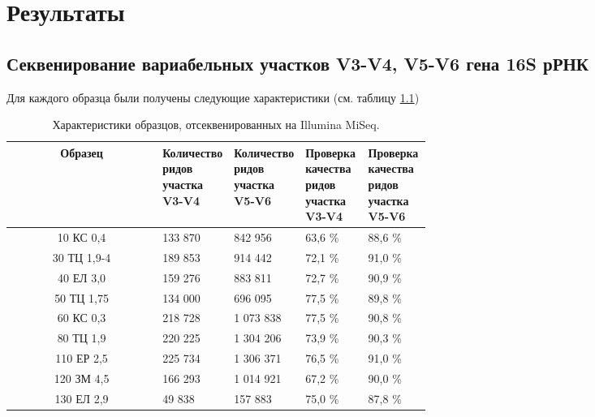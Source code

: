 \chapter{Результаты} \label{chapt2}

\section{Секвенирование вариабельных участков V3-V4, V5-V6 гена 16S рРНК} \label{sect2_1}

Для каждого образца были получены следующие характеристики (см. таблицу \ref{tab:16Sread_Ill_characteristic})

\begin{table}[H]
\caption{Характеристики образцов, отсеквенированных на Illumina MiSeq.}\label{tab:16Sread_Ill_characteristic}
\begin{center}
\begin{tabular}{|c|p{0.15\linewidth}|p{0.15\linewidth}|p{0.15\linewidth}|p{0.15\linewidth}|}
\hline
Образец & Количество ридов участка V3-V4 & Количество ридов участка V5-V6 & Проверка качества ридов участка V3-V4 & Проверка качества ридов участка V5-V6 \\
\hline
10 КС 0,4 &                                                                                                                                                                                                                                                                                                                                                                                                                                                                                                                                                                            133 870 & 842 956 & 63,6 \% & 88,6 \% \\
30 ТЦ 1,9-4 & 189 853 & 914 442 & 72,1 \% & 91,0 \% \\
40 ЕЛ 3,0 & 159 276 & 883 811 & 72,7 \% & 90,9 \% \\
50 ТЦ 1,75 & 134 000 & 696 095 & 77,5 \% & 89,8 \% \\
60 КС 0,3 & 218 728 & 1 073 838 & 77,5 \% & 90,8 \% \\
80 ТЦ 1,9 & 220 225 & 1 304 206 & 73,9 \% & 90,3 \% \\
110 ЕР 2,5 & 225 734 & 1 306 371 & 76,5 \% & 91,0 \% \\
120 ЗМ 4,5 & 166 293 & 1 014 921 & 67,2 \% & 90,0 \% \\
130 ЕЛ 2,9 & 49 838 & 157 883 & 75,0 \% & 87,8 \% \\
\hline
\end{tabular}
\end{center}
\end{table}


